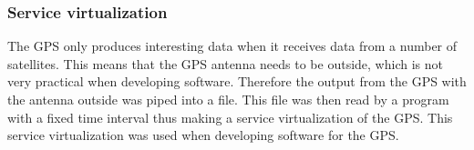 \subsubsection{Service virtualization}
The GPS only produces interesting data when it receives data from a number of satellites. 
This means that the GPS antenna needs to be outside, which is not very practical when developing software.
Therefore the output from the GPS with the antenna outside was piped into a file.
This file was then read by a program with a fixed time interval thus making a service virtualization of the GPS.
This service virtualization was used when developing software for the GPS.